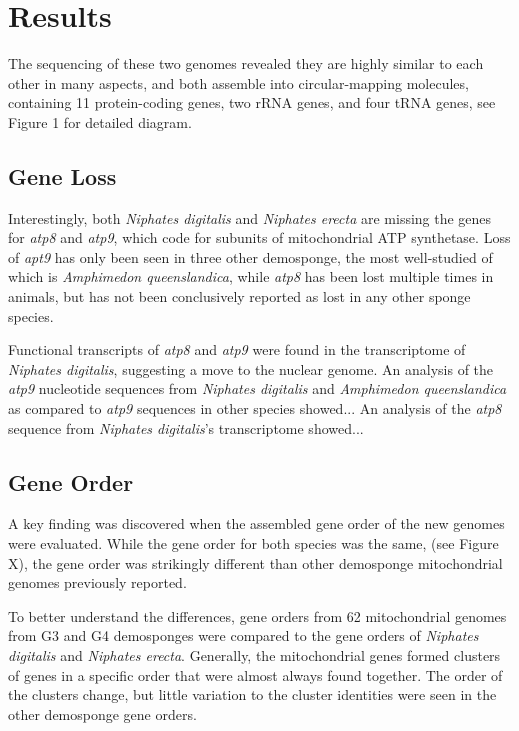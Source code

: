 \documentclass[../main.tex]{subfiles}
\begin{document}
\section{Results}

The sequencing of these two genomes revealed they are highly similar to each other in many aspects, and both assemble into circular-mapping molecules, containing 11 protein-coding genes, two rRNA genes, and four tRNA genes, see Figure 1 for detailed diagram.

\subsection{Gene Loss}
Interestingly, both \emph{Niphates digitalis} and \emph{Niphates erecta} are missing the genes for \emph{atp8} and \emph{atp9}, which code for subunits of mitochondrial ATP synthetase. Loss of \emph{apt9} has only been seen in three other demosponge, the most well-studied of which is \emph{Amphimedon queenslandica}, while \emph{atp8} has been lost multiple times in animals, but has not been conclusively reported as lost in any other sponge species. 

Functional transcripts of \emph{atp8} and \emph{atp9} were found in the transcriptome of \emph{Niphates digitalis}, suggesting a move to the nuclear genome. An analysis of the \emph{atp9} nucleotide sequences from \emph{Niphates digitalis} and \emph{Amphimedon queenslandica} as compared to \emph{atp9} sequences in other species showed... An analysis of the \emph{atp8} sequence from \emph{Niphates digitalis}'s transcriptome showed...

\subsection{Gene Order}
A key finding was discovered when the assembled gene order of the new genomes were evaluated. While the gene order for both species was the same, (see Figure X), the gene order was strikingly different than other demosponge mitochondrial genomes previously reported. 

To better understand the differences, gene orders from 62 mitochondrial genomes from G3 and G4 demosponges were compared to the gene orders of \emph{Niphates digitalis} and \emph{Niphates erecta}. Generally, the mitochondrial genes formed clusters of genes in a specific order that were almost always found together. The order of the clusters change, but little variation to the cluster identities were seen in the other demosponge gene orders.
\end{document}
